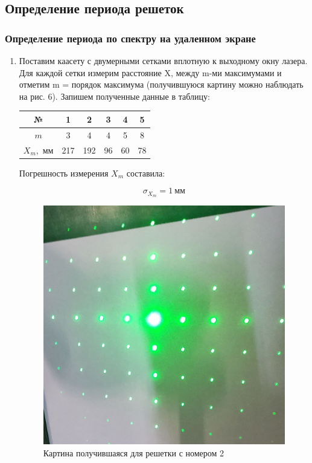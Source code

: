\documentclass[a4paper, 12pt]{article}%
\begin{document}
\begin{enumerate}
\end{enumerate}

\newpage

\subsection*{Определение периода решеток}

\subsubsection*{Определение периода по спектру на удаленном экране}

\begin{enumerate}

\item Поставим каасету с двумерными сетками вплотную к выходному окну лазера. Для каждой сетки измерим расстояние X, между m-ми максимумами и отметим m = порядок максимума (получившуюся картину можно наблюдать на рис. 6). Запишем полученные данные в таблицу:

\begin{center}
\begin{tabular}{|c|c|c|c|c|c|}
\hline 
№ & 1 & 2 & 3 & 4 & 5 \\ 
\hline 
$m$ & 3 & 4 & 4 & 5 & 8 \\ 
\hline 
$X_m,$ мм & 217 & 192 & 96 & 60 & 78 \\ 
\hline 
\end{tabular} 
\end{center}

Погрешность измерения $X_m$ составила:

\[\sigma_{X_m} = 1 \: \text{мм}\]

\begin{figure}[h!]
    \centering
	\includegraphics[width = 0.5\linewidth]{images/img_1.jpg}
	\caption{Картина получившаяся для решетки с номером 2}
\end{figure}


\end{enumerate}
\end{document}
